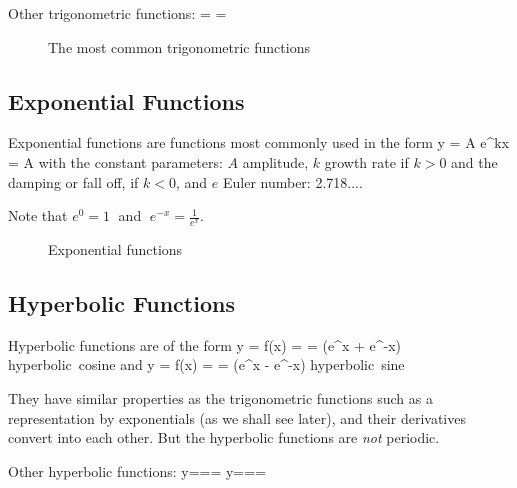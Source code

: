 Other trigonometric functions:
\bnn {} =  \qquad\qquad {} =  \enn

\begin{figure}[!h]
\centering 
{}
\hspace*{0.5cm}
 \svs
\caption{The most common trigonometric functions} \label{fig12}
\end{figure}


\subsection{Exponential Functions}

Exponential functions are functions most commonly used in the form
\bnn y = A e^{kx} = A  \enn
with the constant parameters: $A$ amplitude, $k$ growth rate if $k>0$ and the damping or fall 
off, if $k<0$, and $e$ Euler number: 2.718....

Note that $e^0=1\;$ and $\;e^{-x}=\frac{1}{e^x}$. \svs

\begin{figure}[!h]
    \centerline{\epsfxsize=10cm }
    \caption{Exponential functions} \label{fig13}
\end{figure} \vs


\subsection{Hyperbolic Functions}

Hyperbolic functions are of the form
\bnn y = f(x) =  = (e^x + e^{-x}) \qquad\mbox{hyperbolic cosine} \enn
and
\bnn y = f(x) =  = (e^x - e^{-x}) \qquad\mbox{hyperbolic sine} \enn

They have similar properties as the trigonometric functions such as a representation by
exponentials (as we shall see later), and their derivatives convert into each other. 
But the hyperbolic functions are {\em not} periodic. \vs

Other hyperbolic functions:
\bnn
y=== \qquad
y===
\enn

